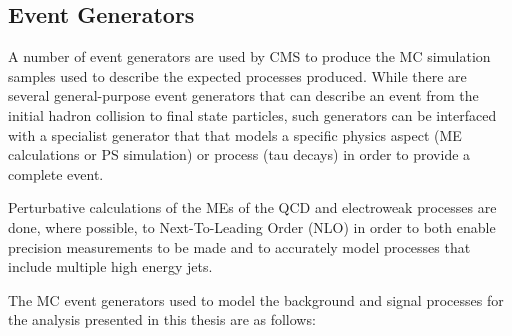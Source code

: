 \subsection{Event Generators}\label{subsec:eventGenerators}
A number of event generators are used by CMS to produce the MC simulation samples used to describe the expected processes produced.
While there are several general-purpose event generators that can describe an event from the initial hadron collision to final state particles, such generators can be interfaced with a specialist generator that that models a specific physics aspect (\ie ME calculations or PS simulation) or process (\eg tau decays) in order to provide a complete event.

Perturbative calculations of the MEs of the QCD and electroweak processes are done, where possible, to Next-To-Leading Order (NLO) in order to both enable precision measurements to be made and to accurately model processes that include multiple high energy jets.

The MC event generators used to model the background and signal processes for the analysis presented in this thesis are as follows:

